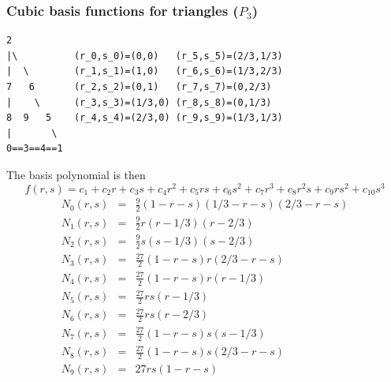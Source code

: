 









\subsubsection{Cubic basis functions for triangles ($P_3$)}

\begin{verbatim}
2
|\          (r_0,s_0)=(0,0)   (r_5,s_5)=(2/3,1/3)
|  \        (r_1,s_1)=(1,0)   (r_6,s_6)=(1/3,2/3)
7   6       (r_2,s_2)=(0,1)   (r_7,s_7)=(0,2/3)
|    \      (r_3,s_3)=(1/3,0) (r_8,s_8)=(0,1/3)
8  9   5    (r_4,s_4)=(2/3,0) (r_9,s_9)=(1/3,1/3)
|       \ 
0==3==4==1
\end{verbatim}
The basis polynomial is then
\[
f(r,s) = c_1 + c_2r + c_3s + c_4 r^2 + c_5 rs + c_6 s^2 + c_7 r^3 +c_8 r^2s + c_9 rs^2 + c_{10}s^3
\]
\begin{eqnarray}
N_0(r,s) &=& \frac{9}{2}(1-r-s)(1/3-r-s)(2/3-r-s) \\
N_1(r,s) &=& \frac{9}{2}r(r-1/3)(r-2/3) \\
N_2(r,s) &=& \frac{9}{2}s(s-1/3)(s-2/3) \\
N_3(r,s) &=& \frac{27}{2}(1-r-s)r(2/3-r-s) \\
N_4(r,s) &=& \frac{27}{2}(1-r-s)r(r-1/3) \\
N_5(r,s) &=& \frac{27}{2}rs(r-1/3) \\
N_6(r,s) &=& \frac{27}{2}rs(r-2/3) \\
N_7(r,s) &=& \frac{27}{2}(1-r-s)s(s-1/3) \\
N_8(r,s) &=& \frac{27}{2}(1-r-s)s(2/3-r-s) \\
N_9(r,s) &=& 27 rs(1-r-s)
\end{eqnarray}




















